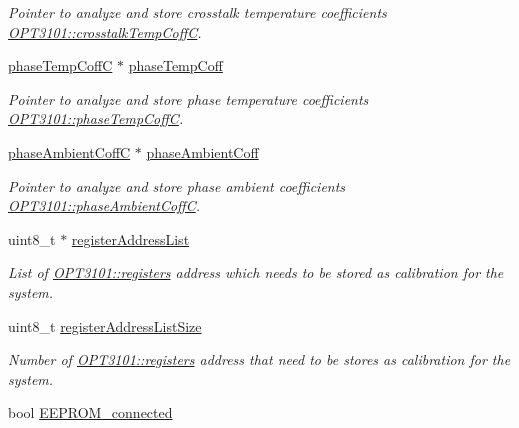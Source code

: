 \begin{DoxyCompactItemize}
\begin{DoxyCompactList}\small\item\em Pointer to analyze and store crosstalk temperature coefficients \mbox{\hyperlink{class_o_p_t3101_1_1crosstalk_temp_coff_c}{O\+P\+T3101\+::crosstalk\+Temp\+CoffC}}. \end{DoxyCompactList}\item 
\mbox{\hyperlink{class_o_p_t3101_1_1phase_temp_coff_c}{phase\+Temp\+CoffC}} $\ast$ \mbox{\hyperlink{class_o_p_t3101_1_1calibration_c_a277a7bbf506f5f5181719311d10bc610}{phase\+Temp\+Coff}}
\begin{DoxyCompactList}\small\item\em Pointer to analyze and store phase temperature coefficients \mbox{\hyperlink{class_o_p_t3101_1_1phase_temp_coff_c}{O\+P\+T3101\+::phase\+Temp\+CoffC}}. \end{DoxyCompactList}\item 
\mbox{\hyperlink{class_o_p_t3101_1_1phase_ambient_coff_c}{phase\+Ambient\+CoffC}} $\ast$ \mbox{\hyperlink{class_o_p_t3101_1_1calibration_c_ab69d912cc3cad353abeb73d7a95b7428}{phase\+Ambient\+Coff}}
\begin{DoxyCompactList}\small\item\em Pointer to analyze and store phase ambient coefficients \mbox{\hyperlink{class_o_p_t3101_1_1phase_ambient_coff_c}{O\+P\+T3101\+::phase\+Ambient\+CoffC}}. \end{DoxyCompactList}\item 
uint8\+\_\+t $\ast$ \mbox{\hyperlink{class_o_p_t3101_1_1calibration_c_a8ddd81159778cc987557c9b4920d5b57}{register\+Address\+List}}
\begin{DoxyCompactList}\small\item\em List of \mbox{\hyperlink{class_o_p_t3101_1_1registers}{O\+P\+T3101\+::registers}} address which needs to be stored as calibration for the system. \end{DoxyCompactList}\item 
uint8\+\_\+t \mbox{\hyperlink{class_o_p_t3101_1_1calibration_c_a5331ffae8b40e63d277b907a6bf84aa3}{register\+Address\+List\+Size}}
\begin{DoxyCompactList}\small\item\em Number of \mbox{\hyperlink{class_o_p_t3101_1_1registers}{O\+P\+T3101\+::registers}} address that need to be stores as calibration for the system. \end{DoxyCompactList}\item 
bool \mbox{\hyperlink{class_o_p_t3101_1_1calibration_c_ac56e02e52f84fb4a601b0104e0c6b607}{E\+E\+P\+R\+O\+M\+\_\+connected}}

\end{DoxyCompactItemize}
